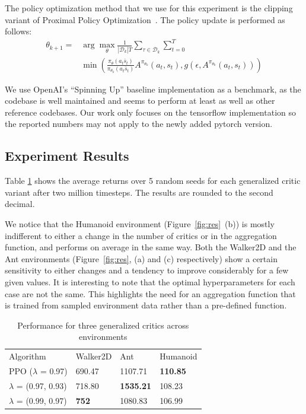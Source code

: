 The policy optimization method that we use for this experiment is the clipping variant of Proximal Policy Optimization~\cite{schulman2017proximal}. The policy update is performed as follows:
\begin{align*}
\theta_{k+1} = & \arg \max_{\theta} \frac{1}{| \mathcal{D}_k | T} \sum_{\tau \in \mathcal{D}_k} \sum_{t=0}^T \\ 
& \min \left(\frac{\pi_{\theta}(a_t\bar s_t)}{\pi_{\theta_k}(a_t\bar s_t)} A^{\pi_{\theta_k}}(a_t, s_t), g(\epsilon, A^{\pi_{\theta_k}}(a_t, s_t))\right)
\end{align*}

We use OpenAI's ``Spinning Up'' baseline implementation \cite{achiam2018openai} as a benchmark, as the codebase is well maintained and seems to perform at least as well as other reference codebases. Our work only focuses on the tensorflow implementation so the reported numbers may not apply to the newly added pytorch version.
\subsection{Experiment Results}

Table \ref{tab:reslam} shows the average returns over 5 random seeds for each generalized critic variant after two million timesteps. The results are rounded to the second decimal.

We notice that the Humanoid environment (Figure~\ref{fig:res}~(b)) is mostly indifferent to either a change in the number of critics or in the aggregation function, and performs on average in the same way. Both the Walker2D and the Ant environments (Figure~\ref{fig:res}, (a) and (c) respectively) show a certain sensitivity to either changes and a tendency to improve considerably for a few given values. It is interesting to note that the optimal hyperparameters for each case are not the same. This highlights the need for an aggregation function that is trained from sampled environment data rather than a pre-defined function.

\begin{table}[!htb]
\begin{tabular}{p{22mm}p{14mm}p{15mm}p{11mm}}
Algorithm & Walker2D & Ant & Humanoid \\
PPO ($\lambda$ = 0.97) & 690.47 & 1107.71 & \textbf{110.85} \\
\hline
$\lambda$ = (0.97, 0.93) & 718.80 & \textbf{1535.21} & 108.23  \\ 
\hline
$\lambda$ = (0.99, 0.97)& \textbf{752} & 1080.83 & 106.99 \\ 
\end{tabular}
\caption{Performance for three generalized critics across environments}
\label{tab:reslam}
\end{table}

